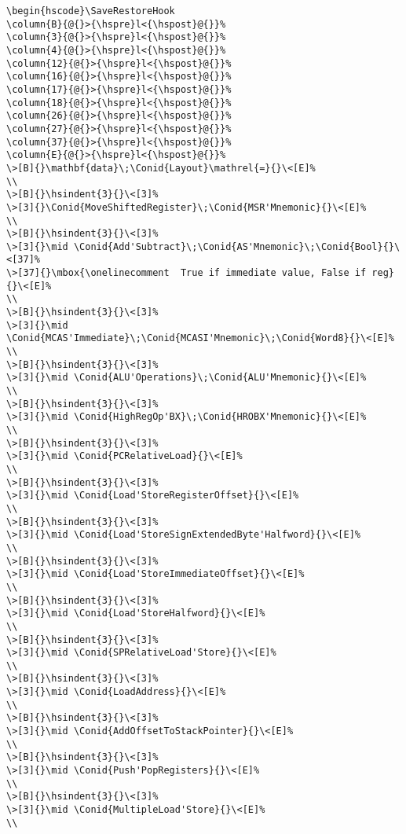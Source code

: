 \documentclass{article}
\newcommand{\Conid}[1]{\mathit{#1}}
\newcommand{\hsindent}[1]{\quad}%
\let\hspre\empty
\let\hspost\empty
\begin{document}
\begin{Verbatim}[fontsize=\scriptsize]
\begin{hscode}\SaveRestoreHook
\column{B}{@{}>{\hspre}l<{\hspost}@{}}%
\column{3}{@{}>{\hspre}l<{\hspost}@{}}%
\column{4}{@{}>{\hspre}l<{\hspost}@{}}%
\column{12}{@{}>{\hspre}l<{\hspost}@{}}%
\column{16}{@{}>{\hspre}l<{\hspost}@{}}%
\column{17}{@{}>{\hspre}l<{\hspost}@{}}%
\column{18}{@{}>{\hspre}l<{\hspost}@{}}%
\column{26}{@{}>{\hspre}l<{\hspost}@{}}%
\column{27}{@{}>{\hspre}l<{\hspost}@{}}%
\column{37}{@{}>{\hspre}l<{\hspost}@{}}%
\column{E}{@{}>{\hspre}l<{\hspost}@{}}%
\>[B]{}\mathbf{data}\;\Conid{Layout}\mathrel{=}{}\<[E]%
\\
\>[B]{}\hsindent{3}{}\<[3]%
\>[3]{}\Conid{MoveShiftedRegister}\;\Conid{MSR'Mnemonic}{}\<[E]%
\\
\>[B]{}\hsindent{3}{}\<[3]%
\>[3]{}\mid \Conid{Add'Subtract}\;\Conid{AS'Mnemonic}\;\Conid{Bool}{}\<[37]%
\>[37]{}\mbox{\onelinecomment  True if immediate value, False if reg}{}\<[E]%
\\
\>[B]{}\hsindent{3}{}\<[3]%
\>[3]{}\mid \Conid{MCAS'Immediate}\;\Conid{MCASI'Mnemonic}\;\Conid{Word8}{}\<[E]%
\\
\>[B]{}\hsindent{3}{}\<[3]%
\>[3]{}\mid \Conid{ALU'Operations}\;\Conid{ALU'Mnemonic}{}\<[E]%
\\
\>[B]{}\hsindent{3}{}\<[3]%
\>[3]{}\mid \Conid{HighRegOp'BX}\;\Conid{HROBX'Mnemonic}{}\<[E]%
\\
\>[B]{}\hsindent{3}{}\<[3]%
\>[3]{}\mid \Conid{PCRelativeLoad}{}\<[E]%
\\
\>[B]{}\hsindent{3}{}\<[3]%
\>[3]{}\mid \Conid{Load'StoreRegisterOffset}{}\<[E]%
\\
\>[B]{}\hsindent{3}{}\<[3]%
\>[3]{}\mid \Conid{Load'StoreSignExtendedByte'Halfword}{}\<[E]%
\\
\>[B]{}\hsindent{3}{}\<[3]%
\>[3]{}\mid \Conid{Load'StoreImmediateOffset}{}\<[E]%
\\
\>[B]{}\hsindent{3}{}\<[3]%
\>[3]{}\mid \Conid{Load'StoreHalfword}{}\<[E]%
\\
\>[B]{}\hsindent{3}{}\<[3]%
\>[3]{}\mid \Conid{SPRelativeLoad'Store}{}\<[E]%
\\
\>[B]{}\hsindent{3}{}\<[3]%
\>[3]{}\mid \Conid{LoadAddress}{}\<[E]%
\\
\>[B]{}\hsindent{3}{}\<[3]%
\>[3]{}\mid \Conid{AddOffsetToStackPointer}{}\<[E]%
\\
\>[B]{}\hsindent{3}{}\<[3]%
\>[3]{}\mid \Conid{Push'PopRegisters}{}\<[E]%
\\
\>[B]{}\hsindent{3}{}\<[3]%
\>[3]{}\mid \Conid{MultipleLoad'Store}{}\<[E]%
\\

\end{Verbatim}
\end{document}
